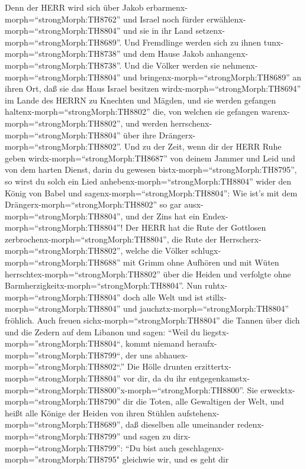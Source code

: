  Denn der HERR wird sich über Jakob
erbarmenx-morph=``strongMorph:TH8762'' und Israel noch fürder
erwählenx-morph=``strongMorph:TH8804'' und sie in ihr Land
setzenx-morph=``strongMorph:TH8689''. Und Fremdlinge werden sich zu
ihnen tunx-morph=``strongMorph:TH8738'' und dem Hause Jakob
anhangenx-morph=``strongMorph:TH8738''.  Und die Völker
werden sie nehmenx-morph=``strongMorph:TH8804'' und
bringenx-morph=``strongMorph:TH8689'' an ihren Ort, daß sie das Haus
Israel besitzen wirdx-morph=``strongMorph:TH8694'' im Lande des HERRN zu
Knechten und Mägden, und sie werden gefangen
haltenx-morph=``strongMorph:TH8802'' die, von welchen sie gefangen
warenx-morph=``strongMorph:TH8802'', und werden
herrschenx-morph=``strongMorph:TH8804'' über ihre
Drängerx-morph=``strongMorph:TH8802''.  Und zu der Zeit,
wenn dir der HERR Ruhe geben wirdx-morph=``strongMorph:TH8687'' von
deinem Jammer und Leid und von dem harten Dienst, darin du gewesen
bistx-morph=``strongMorph:TH8795'',  so wirst du solch ein
Lied anhebenx-morph=``strongMorph:TH8804'' wider den König von Babel und
sagenx-morph=``strongMorph:TH8804'': Wie ist's mit dem
Drängerx-morph=``strongMorph:TH8802'' so gar
ausx-morph=``strongMorph:TH8804'', und der Zins hat ein
Endex-morph=``strongMorph:TH8804''!  Der HERR hat die Rute
der Gottlosen zerbrochenx-morph=``strongMorph:TH8804'', die Rute der
Herrscherx-morph=``strongMorph:TH8802'',  welche die Völker
schlugx-morph=``strongMorph:TH8688'' mit Grimm ohne Aufhören und mit
Wüten herrschtex-morph=``strongMorph:TH8802'' über die Heiden und
verfolgte ohne Barmherzigkeitx-morph=``strongMorph:TH8804''.
 Nun ruhtx-morph=``strongMorph:TH8804'' doch alle Welt und
ist stillx-morph=``strongMorph:TH8804'' und
jauchztx-morph=``strongMorph:TH8804'' fröhlich.  Auch freuen
sichx-morph=``strongMorph:TH8804'' die Tannen über dich und die Zedern
auf dem Libanon und sagen: ``Weil du
liegstx-morph=''strongMorph:TH8804``, kommt niemand
heraufx-morph=''strongMorph:TH8799``, der uns
abhauex-morph=''strongMorph:TH8802``.''  Die Hölle drunten
erzittertx-morph=``strongMorph:TH8804'' vor dir, da du ihr
entgegenkamstx-morph=``strongMorph:TH8800''x-morph=``strongMorph:TH8800''.
Sie erwecktx-morph=``strongMorph:TH8790'' dir die Toten, alle Gewaltigen
der Welt, und heißt alle Könige der Heiden von ihren Stühlen
aufstehenx-morph=``strongMorph:TH8689'',  daß dieselben
alle umeinander redenx-morph=``strongMorph:TH8799'' und sagen zu
dirx-morph=``strongMorph:TH8799'': ``Du bist auch
geschlagenx-morph=''strongMorph:TH8795" gleichwie wir, und es geht dir
